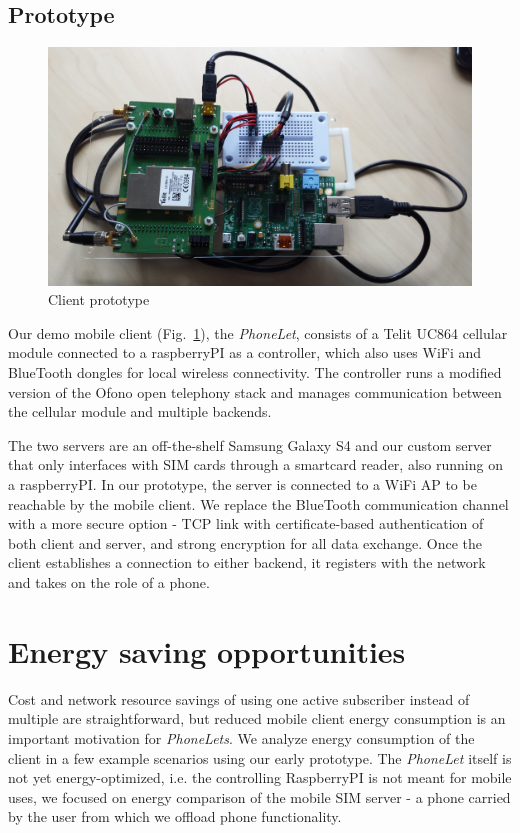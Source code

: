 \documentclass{sig-alternate-10pt}
\begin{document}
\subsection{Prototype}

\begin{figure}[t!]
\centering
\includegraphics[width=0.9\columnwidth]{figs/client}
\vspace{-2mm}
\caption{Client prototype}
\label{fig:client}
\vspace{-3mm}
\end{figure}

Our demo mobile client (Fig.~\ref{fig:client}), the \emph{PhoneLet}, consists of a Telit UC864 cellular module connected to a raspberryPI as a controller, which also uses WiFi and BlueTooth dongles for local wireless connectivity. The controller runs a modified version of the Ofono open telephony stack and manages communication between the cellular module and multiple backends.

The two servers are an off-the-shelf Samsung Galaxy S4 and our custom server that only interfaces with SIM cards through a smartcard reader, also running on a raspberryPI. In our prototype, the server is connected to a WiFi AP to be reachable by the mobile client. We replace the BlueTooth communication channel with a more secure option - TCP link with certificate-based authentication of both client and server, and strong encryption for all data exchange. Once the client establishes a connection to either backend, it registers with the network and takes on the role of a phone.

\section{Energy saving opportunities}
\label{sec:energy}

Cost and network resource savings of using one active subscriber instead of multiple are straightforward, but reduced mobile client energy consumption is an important motivation for \emph{PhoneLets}. We analyze energy consumption of the client in a few example scenarios using our early prototype. The \emph{PhoneLet} itself is not yet energy-optimized, i.e. the controlling RaspberryPI is not meant for mobile uses, we focused on energy comparison of the mobile SIM server - a phone carried by the user from which we offload phone functionality.
\end{document}
